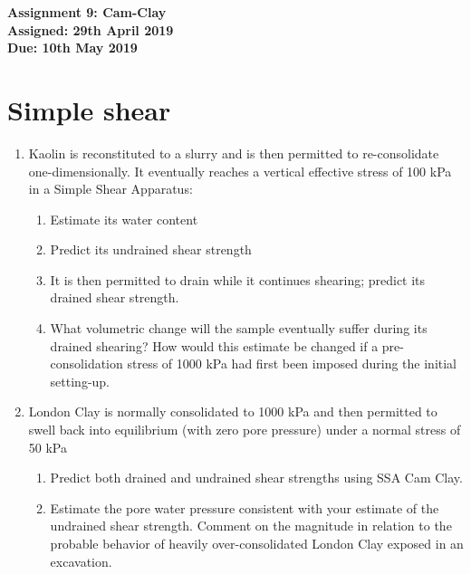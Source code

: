 \documentclass[a4paper,12pt]{article}
\begin{document}
\begin{centering}
	\textbf{
		Assignment 9: Cam-Clay\\
		Assigned: 29th April 2019\\
		Due: 10th May 2019\\
	}
\end{centering}

\vspace{1em}
\section{Simple shear}

\begin{enumerate}
	
	\item Kaolin is reconstituted to a slurry and is then permitted to re-consolidate one-dimensionally. It eventually reaches a vertical effective stress of 100 kPa in a Simple Shear Apparatus:
	\begin{enumerate}
		\item Estimate its water content
		\item Predict its undrained shear strength
		\item It is then permitted to drain while it continues shearing; predict its drained shear strength.
		\item What volumetric change will the sample eventually suffer during its drained shearing? How would this estimate be changed if a pre-consolidation stress of 1000 kPa had first been imposed during the initial setting-up.
	\end{enumerate}

	\item London Clay is normally consolidated to 1000 kPa and then permitted to swell back into equilibrium (with zero pore pressure) under a normal stress of 50 kPa
	\begin{enumerate}
		\item Predict both drained and undrained shear strengths using SSA Cam Clay.
		\item Estimate the pore water pressure consistent with your estimate of the undrained shear strength. Comment on the magnitude in relation to the probable behavior of heavily over-consolidated London Clay exposed in an excavation.
	\end{enumerate}
\end{enumerate}
\end{document}
